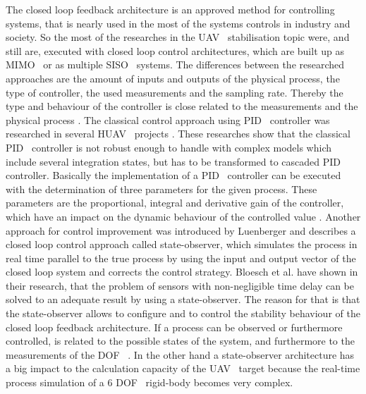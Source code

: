 The closed loop feedback architecture is an approved method for controlling
systems, that is nearly used in the most of the systems controls in industry and
society. So the most of the researches in the \gls{UAV}~ stabilisation topic were, and
still are, executed with closed loop control architectures, which are built up as
\gls{MIMO}~ or as multiple \gls{SISO}~ systems. The differences between the researched
approaches are the amount of inputs and outputs of the physical process, the
type of controller, the used measurements and the sampling rate. Thereby the type
and behaviour of the controller is close related to the measurements and the
physical process . The classical control approach using
\gls{PID}~ controller was researched in several \gls{HUAV}~ projects
 . These researches show that
the classical \gls{PID}~ controller is not robust enough to handle with complex
models which include several integration states, but has to be transformed to cascaded
\gls{PID}~ controller.
\newpage
Basically the implementation of a \gls{PID}~ controller can be executed with the
determination of three parameters for the given process. These parameters are the proportional, integral and derivative gain of the controller, which have an impact on the dynamic behaviour of the controlled value .
Another approach for control improvement was introduced by
Luenberger  and describes a closed loop control approach called state-observer, which simulates the process in real time parallel to the true
process by using the input and output vector of the closed loop system and
corrects the control strategy. Bloesch et al.  have
shown in their research, that the problem of sensors with non-negligible time
delay can be solved to an adequate result by using a state-observer. The reason
for that is that the state-observer allows to configure and to control the
stability behaviour of the closed loop feedback architecture. If a process can be
observed or furthermore controlled, is related to the possible states of the system,
and furthermore to the measurements of the \gls{DOF}~ . In the other hand a
state-observer architecture has a big impact to the calculation capacity of the \gls{UAV}~ target
because the real-time process simulation of a 6 \gls{DOF}~ rigid-body becomes very
complex.


